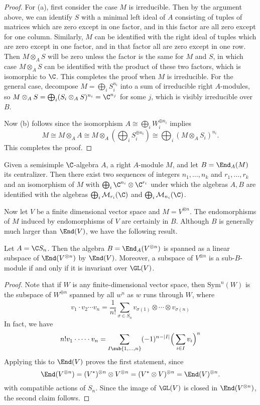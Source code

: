 \begin{proof}
For (a), first consider the case $M$ is irreducible. Then by the argument above, we can identify $S$ with a minimal left ideal of $A$ consisting of tuples of matrices which are zero except in one factor, and in this factor are all zero except for one column. Similarly, $M$ can be identified with the right ideal of tuples which are zero except in one factor, and in that factor all are zero except in one row. Then $M\otimes_AS$ will be zero unless the factor is the same for $M$ and $S$, in which case $M\otimes_AS$ can be identified with the product of these two factors, which is isomorphic to $\C$. This completes the proof when $M$ is irreducible. For the general case, decompose $M=\bigoplus_iS_i^{n_i}$ into a sum of irreducible right $A$-modules, so $M\otimes_AS=\bigoplus_i(S_i\otimes_AS)^{n_i}=\C^{n_j}$ for some $j$, which is visibly irreducible over $B$.\par
Now (b) follows since the isomorphism $A\cong\bigoplus_iW_i^{\oplus n_i}$ implies
\[M\cong M\otimes_AA\cong M\otimes_A(\bigoplus_iS_i^{\oplus n_i})\cong\bigoplus_i(M\otimes_AS_i)^{n_i}.\]
This completes the proof.
\end{proof}
\begin{corollary}
Given a semisimple $\C$-algebra $A$, a right $A$-module $M$, and let $B=\End_A(M)$ its centralizer. Then there exist two sequences of integers $n_1,\dots,n_k$ and $r_1,\dots,r_k$ and an isomorphism of $M$ with $\bigoplus_i\C^{n_i}\otimes\C^{r_i}$ under which the algebras $A,B$ are identified with the algebras $\bigoplus_i\mathcal{M}_{r_i}(\C)$ and $\bigoplus_i\mathcal{M}_{n_i}(\C)$.
\end{corollary}
Now let $V$ be a finite dimensional vector space and $M=V^{\otimes n}$. The endomorphisms of $M$ induced by endomorphisms of $V$ are certainly in $B$. Although $B$ is generally much larger than $\End(V)$, we have the following result.
\begin{proposition}
Let $A=\C S_n$. Then the algebra $B=\End_{A}(V^{\otimes n})$ is spanned as a linear subspace of $\End(V^{\otimes n})$ by $\End(V)$. Moreover, a subspace of $V^{\otimes n}$ is a sub-$B$-module if and only if it is invariant over $\GL(V)$.
\end{proposition}
\begin{proof}
Note that if $W$ is any finite-dimensional vector space, then $\mathrm{Sym}^n(W)$ is the subspace of $W^{\oplus n}$ spanned by all $w^n$ as $w$ runs through $W$, where
\[v_1\cdot v_2\cdots v_n=\frac{1}{n!}\sum_{\sigma\in S_n}v_{\sigma(1)}\otimes\cdots\otimes v_{\sigma(n)}\]
In fact, we have
\[n!v_1\cdot\cdots\cdot v_n=\sum_{I\sub\{1,\dots,n\}}(-1)^{n-|I|}\Big(\sum_{i\in I}v_i\Big)^n\]
Applying this to $\End(V)$ proves the first statement, since
\[\End(V^{\otimes n})=(V^*)^{\otimes n}\otimes V^{\otimes n}=(V^*\otimes V)^{\otimes n}=\End(V)^{\otimes n}.\]
with compatible actions of $S_n$. Since the image of $\GL(V)$ is closed in $\End(V^{\otimes n})$, the second claim follows.
\end{proof}
